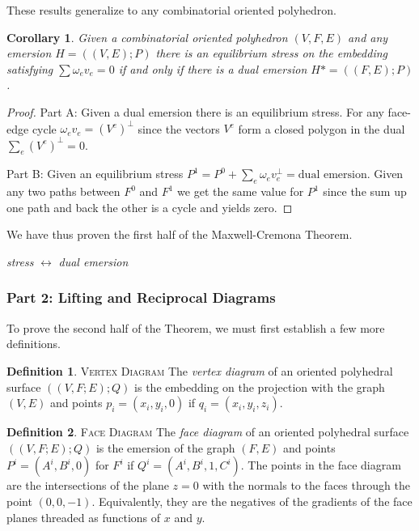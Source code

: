\documentclass[11pt]{article}
\newtheorem{corollary}{Corollary}[theorem]
\theoremstyle{definition}
\newtheorem{definition}{Definition}[section]
\begin{document}
	These results generalize to any combinatorial oriented polyhedron.
	
	\begin{corollary} 
		Given a combinatorial oriented polyhedron $(V,F,E)$ and any emersion $H = ((V,E);P)$ there is an equilibrium stress on the embedding satisfying $\sum \omega_ev_e = 0$ if and only if there is a dual emersion $H* = ((F,E);P)$. 
	\end{corollary}

	\begin{proof} 
		Part A: Given a dual emersion there is an equilibrium stress.
		For any face-edge cycle $\omega_e v_e = (V^e)^{\bot}$ since the vectors $V^e$ form a closed polygon in the dual $\sum_e(V^e)^\bot = 0$.

		Part B: Given an equilibrium stress $P^1 = P^0 + \sum_e \omega_ev_e^\bot = \text{dual emersion}$.
		Given any two paths between $F^0$ and $F^1$ we get the same value for $P^1$ since the sum up one path and back the other is a cycle and yields zero.
	\end{proof}
	
	We have thus proven the first half of the Maxwell-Cremona Theorem.

	\emph{stress} $\leftrightarrow$ \emph{dual emersion}

\subsubsection{Part 2: Lifting and Reciprocal Diagrams}

	To prove the second half of the Theorem, we must first establish a few more definitions.
	
	\theoremstyle{definition}
	\begin{definition}{\textsc{Vertex Diagram}}
		The \emph{vertex diagram} of an oriented polyhedral surface $((V,F;E);Q)$ is the embedding on the projection with the graph $(V,E)$ and points $p_i = (x_i,y_i,0)$ if $q_i = (x_i,y_i,z_i)$.
	\end{definition}
	
	\theoremstyle{definition}
	\begin{definition}{\textsc{Face Diagram}}
		The \emph{face diagram} of an oriented polyhedral surface $((V,F;E);Q)$ is the emersion of the graph $(F,E)$ and points $P^i = (A^i,B^i,0)$ for $F^i$ if $Q^i = (A^i,B^i,1,C^i)$. 
		The points in the face diagram are the intersections of the plane $z=0$ with the normals to the faces through the point $(0,0,-1)$. 
		Equivalently, they are the negatives of the gradients of the face planes threaded as functions of $x$ and $y$.
	\end{definition}
	
\end{document}
